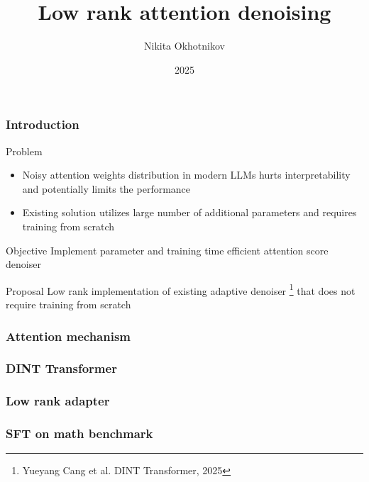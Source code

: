 \documentclass[10pt]{beamer}
\title[]{Low rank attention denoising}
\author{Nikita Okhotnikov}
\institute{MIPT}
\date{2025}
\begin{document}
\begin{frame}
  \titlepage
\end{frame}


\begin{frame}
    \frametitle{Introduction}
    \begin{block}{Problem}
        \begin{itemize}
            \item Noisy attention weights distribution in modern LLMs hurts interpretability and potentially limits the performance
            \item Existing solution utilizes large number of additional parameters and requires training from scratch
        \end{itemize}
    \end{block}
    \begin{block}{Objective}
        Implement parameter and training time efficient attention score denoiser      
    \end{block}
    \begin{block}{Proposal}
        Low rank implementation of existing adaptive denoiser \footnote{Yueyang Cang et al. DINT Transformer, 2025} that does not require training from scratch
    \end{block}
\end{frame}

\begin{frame}
    \frametitle{Attention mechanism}
        
\end{frame}


\begin{frame}
    \frametitle{DINT Transformer}
        
\end{frame}


\begin{frame}
    \frametitle{Low rank adapter}
        
\end{frame}


\begin{frame}
    \frametitle{SFT on math benchmark}
        
\end{frame}
\end{document}
